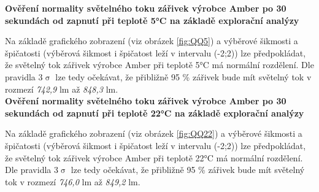 \documentclass[czech]{article}%
\begin{document}
\textbf{Ověření normality světelného toku zářivek výrobce Amber po 30 sekundách od zapnutí při teplotě 5°C na základě explorační analýzy}

Na základě grafického zobrazení (viz obrázek \ref{fig:QQ5}) a výběrové šikmosti a špičatosti (výběrová šikmost i špičatost leží v intervalu (-2;2)) 
lze předpokládat, že světelný tok zářivek výrobce Amber při teplotě 5°C má normální rozdělení. Dle pravidla 3$\upsigma$ 
lze tedy očekávat, že přibližně 95 \% zářivek bude mít světelný tok v rozmezí \textit{742,9} lm až \textit{848,3} lm.\\


\textbf{Ověření normality světelného toku zářivek výrobce Amber po 30 sekundách od zapnutí při teplotě 22°C na základě explorační analýzy}

Na základě grafického zobrazení (viz obrázek \ref{fig:QQ22}) a výběrové šikmosti a špičatosti (výběrová šikmost i špičatost leží v intervalu (-2;2)) 
lze předpokládat, že světelný tok zářivek výrobce Amber při teplotě 22°C má normální rozdělení. Dle pravidla 3$\upsigma$ 
lze tedy očekávat, že přibližně 95 \% zářivek bude mít světelný tok v rozmezí \textit{746,0} lm až \textit{849,2} lm.\\
\end{document}
